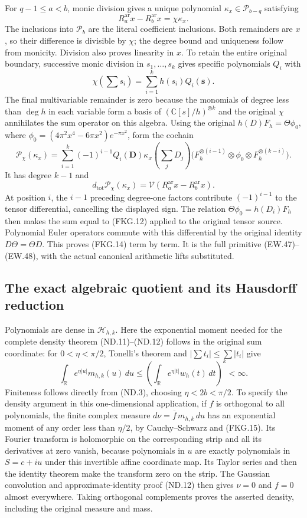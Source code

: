 For $q-1\leq a<b$, monic division gives a unique polynomial
$\kappa_x\in\mathcal P_{b-q}$ satisfying
\[
 R_a^{\mathrm{ar}}x-R_b^{\mathrm{ar}}x=\chi\kappa_x.
 \tag{FKG.11}
\]
The inclusions into $\mathcal P_b$ are the literal coefficient
inclusions. Both remainders are $x$, so their difference is divisible
by $\chi$; the degree bound and uniqueness follow from monicity.
Division also proves linearity in $x$. To retain the entire original
boundary, successive monic division in $s_1,\ldots,s_k$ gives specific
polynomials $Q_i$ with
\[
 \chi(\textstyle\sum s_i)=\sum_{i=1}^kh(s_i)Q_i(\mathbf s).
 \tag{FKG.12}
\]
The final multivariable remainder is zero because the monomials of
degree less than $\deg h$ in each variable form a basis of
$(\mathbb C[s]/h)^{\otimes k}$ and the original $\chi$ annihilates
the sum operator on this algebra. Using the original
$h(D)F_h=\Theta\phi_0$, where
$\phi_0=(4\pi^2x^4-6\pi x^2)e^{-\pi x^2}$, form the cochain
\[
 \mathcal P_\chi(\kappa_x)=
 \sum_{i=1}^k(-1)^{i-1}Q_i(\mathbf D)
       \kappa_x(\textstyle\sum_jD_j)
 \bigl(F_h^{\otimes(i-1)}\otimes\phi_0
                          \otimes F_h^{\otimes(k-i)}\bigr).
 \tag{FKG.13}
\]
It has degree $k-1$ and
\[
 d_{\mathrm{tot}}\mathcal P_\chi(\kappa_x)
        =\mathcal V(R_a^{\mathrm{ar}}x-R_b^{\mathrm{ar}}x).
 \tag{FKG.14}
\]
At position $i$, the $i-1$ preceding degree-one factors contribute
$(-1)^{i-1}$ to the tensor differential, cancelling the displayed
sign. The relation $\Theta\phi_0=h(D_i)F_h$ then makes the sum
equal to (FKG.12) applied to the original tensor source. Polynomial
Euler operators commute with this differential by the original
identity $D\Theta=\Theta D$. This proves (FKG.14) term by term.
It is the full primitive (EW.47)--(EW.48), with the actual canonical
arithmetic lifts substituted.

\subsection{The exact algebraic quotient and its Hausdorff reduction}

Polynomials are dense in $\mathscr H_{h,k}$. Here the exponential
moment needed for the complete density theorem (ND.11)--(ND.12)
follows in the original sum coordinate: for $0<\eta<\pi/2$,
Tonelli's theorem and $|\sum t_i|\leq\sum|t_i|$ give
\[
 \int_{\mathbb R}e^{\eta|u|}m_{h,k}(u)\,du
 \leq\left(\int_{\mathbb R}e^{\eta|t|}w_h(t)\,dt\right)^k<\infty.
 \tag{FKG.15}
\]
Finiteness follows directly from (ND.3), choosing $\eta<2b<\pi/2$.
To specify the density argument in this one-dimensional application,
if $f$ is orthogonal to all polynomials, the finite complex measure
$d\nu=\overline f\,m_{h,k}\,du$ has an exponential moment of any
order less than $\eta/2$, by Cauchy--Schwarz and (FKG.15). Its
Fourier transform is holomorphic on the corresponding strip and
all its derivatives at zero vanish, because polynomials in $u$
are exactly polynomials in $S=c+iu$ under this invertible affine
coordinate map. Its Taylor series and then the identity theorem
make the transform zero on the strip. The Gaussian convolution
and approximate-identity proof (ND.12) then gives $\nu=0$ and
$f=0$ almost everywhere. Taking orthogonal complements proves
the asserted density, including the original measure and mass.

